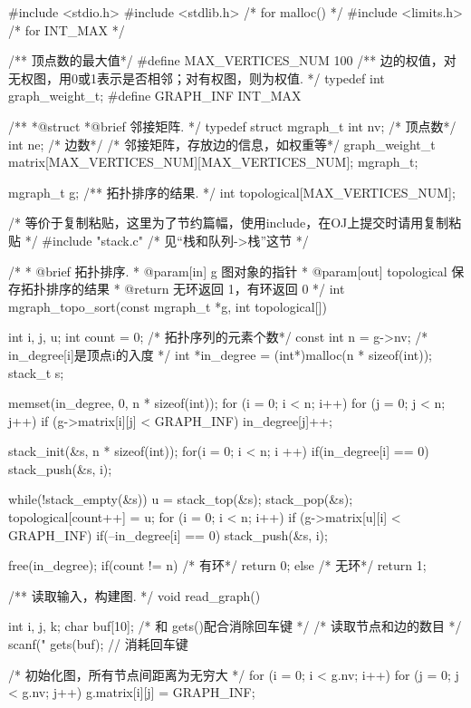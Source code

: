 \begin{Codex}[label=mgraph_topo_sort.c]
#include <stdio.h>
#include <stdlib.h>  /* for malloc() */
#include <limits.h>  /* for INT_MAX */

/** 顶点数的最大值*/
#define MAX_VERTICES_NUM 100
/** 边的权值，对无权图，用0或1表示是否相邻；对有权图，则为权值. */
typedef int graph_weight_t;
#define GRAPH_INF INT_MAX

/**
 *@struct
 *@brief 邻接矩阵.
 */
typedef struct mgraph_t {
    int nv; /* 顶点数*/
    int ne; /* 边数*/
    /* 邻接矩阵，存放边的信息，如权重等*/
    graph_weight_t matrix[MAX_VERTICES_NUM][MAX_VERTICES_NUM];
} mgraph_t;

mgraph_t g;
/** 拓扑排序的结果. */
int topological[MAX_VERTICES_NUM];

/* 等价于复制粘贴，这里为了节约篇幅，使用include，在OJ上提交时请用复制粘贴 */
#include "stack.c"  /* 见“栈和队列->栈”这节 */

/*
  * @brief 拓扑排序.
  * @param[in] g 图对象的指针
  * @param[out] topological 保存拓扑排序的结果
  * @return 无环返回 1，有环返回 0
  */
int mgraph_topo_sort(const mgraph_t *g, int topological[]) {
    int i, j, u;
    int count = 0; /* 拓扑序列的元素个数*/
    const int n = g->nv;
    /* in_degree[i]是顶点i的入度 */
    int *in_degree = (int*)malloc(n * sizeof(int));
    stack_t s;

    memset(in_degree, 0, n * sizeof(int));
    for (i = 0; i < n; i++) {
        for (j = 0; j < n; j++) {
            if (g->matrix[i][j] < GRAPH_INF)
                in_degree[j]++;
        }
    }

    stack_init(&s, n * sizeof(int));
    for(i = 0; i < n; i ++) {
        if(in_degree[i] == 0)
            stack_push(&s, i);
    }

    while(!stack_empty(&s)) {
        u = stack_top(&s); stack_pop(&s);
        topological[count++] = u;
        for (i = 0; i < n; i++) if (g->matrix[u][i] < GRAPH_INF) {
            if(--in_degree[i] == 0) stack_push(&s, i);
        }
    }

    free(in_degree);
    if(count != n) { /* 有环*/
        return 0;
    } else { /* 无环*/
        return 1;
    }
}

/** 读取输入，构建图. */
void read_graph() {
    int i, j, k;
    char buf[10]; /* 和 gets()配合消除回车键 */
    /* 读取节点和边的数目 */
    scanf("%
    gets(buf); // 消耗回车键

    /* 初始化图，所有节点间距离为无穷大 */
    for (i = 0; i < g.nv; i++) {
        for (j = 0; j < g.nv; j++) {
            g.matrix[i][j] = GRAPH_INF;
        }
    }

}
\end{Codex}
